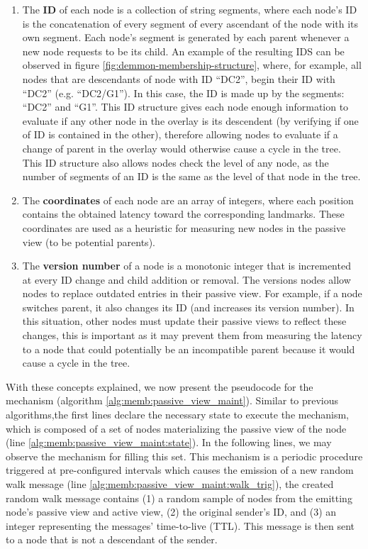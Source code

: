 \begin{enumerate}
    \item The \textbf{ID} of each node is a collection of string segments, where each node's ID is the concatenation of every segment of every ascendant of the node with its own segment. Each node's segment is generated by each parent whenever a new node requests to be its child. An example of the resulting IDS can be observed in figure \ref{fig:demmon-membership-structure}, where, for example, all nodes that are descendants of node with ID ``DC2'', begin their ID with ``DC2'' (e.g. ``DC2/G1''). In this case, the ID is made up by the segments: ``DC2'' and ``G1''. This ID structure gives each node enough information to evaluate if any other node in the overlay is its descendent (by verifying if one of ID is contained in the other), therefore allowing nodes to evaluate if a change of parent in the overlay would otherwise cause a cycle in the tree. This ID structure also allows nodes check the level of any node, as the number of segments of an ID is the same as the level of that node in the tree.
    
    \item The \textbf{coordinates} of each node are an array of integers, where each position contains the obtained latency toward the corresponding landmarks. These coordinates are used as a heuristic for measuring new nodes in the passive view (to be potential parents).
    
    \item The \textbf{version number} of a node is a monotonic integer that is incremented at every ID change and child addition or removal. The versions nodes allow nodes to replace outdated entries in their passive view. For example, if a node switches parent, it also changes its ID (and increases its version number). In this situation, other nodes must update their passive views to reflect these changes, this is important as it may prevent them from measuring the latency to a node that could potentially be an incompatible parent because it would cause a cycle in the tree.
\end{enumerate}

With these concepts explained, we now present the pseudocode for the mechanism (algorithm \ref{alg:memb:passive_view_maint}). Similar to previous algorithms,the first lines declare the necessary state to execute the mechanism, which is composed of a set of nodes materializing the passive view of the node (line \ref{alg:memb:passive_view_maint:state}). In the following lines, we may observe the mechanism for filling this set. This mechanism is a periodic procedure triggered at pre-configured intervals which causes the emission of a new random walk message (line \ref{alg:memb:passive_view_maint:walk_trig}), the created random walk message contains (1) a random sample of nodes from the emitting node's passive view and active view, (2) the original sender's ID, and (3) an integer representing the messages' time-to-live (TTL). This message is then sent to a node that is not a descendant of the sender.

